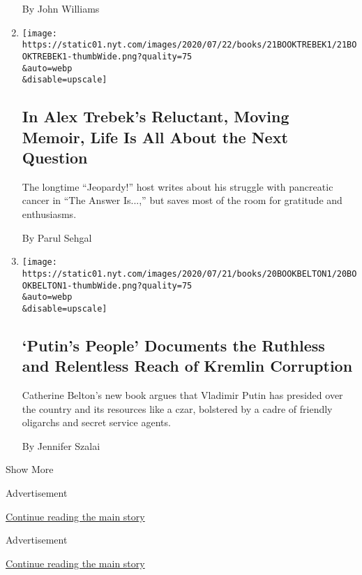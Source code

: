 \begin{enumerate}
  By John Williams
\item
  \href{/2020/07/21/books/review-answer-is-alex-trebek-jeopardy-memoir.html}{}

  \texttt{[image: https://static01.nyt.com/images/2020/07/22/books/21BOOKTREBEK1/21BOOKTREBEK1-thumbWide.png?quality=75\\\&auto=webp\\\&disable=upscale]}

  \hypertarget{in-alex-trebeks-reluctant-moving-memoir-life-is-all-about-the-next-question}{%
  \subsection{In Alex Trebek's Reluctant, Moving Memoir, Life Is All
  About the Next
  Question}\label{in-alex-trebeks-reluctant-moving-memoir-life-is-all-about-the-next-question}}

  The longtime ``Jeopardy!'' host writes about his struggle with
  pancreatic cancer in ``The Answer Is...,'' but saves most of the room
  for gratitude and enthusiasms.

  By Parul Sehgal
\item
  \href{/2020/07/16/books/review-putins-people-kgb-catherine-belton.html}{}

  \texttt{[image: https://static01.nyt.com/images/2020/07/21/books/20BOOKBELTON1/20BOOKBELTON1-thumbWide.png?quality=75\\\&auto=webp\\\&disable=upscale]}

  \hypertarget{putins-people-documents-the-ruthless-and-relentless-reach-of-kremlin-corruption}{%
  \subsection{`Putin's People' Documents the Ruthless and Relentless
  Reach of Kremlin
  Corruption}\label{putins-people-documents-the-ruthless-and-relentless-reach-of-kremlin-corruption}}

  Catherine Belton's new book argues that Vladimir Putin has presided
  over the country and its resources like a czar, bolstered by a cadre
  of friendly oligarchs and secret service agents.

  By Jennifer Szalai
\end{enumerate}

Show More

Advertisement

\protect\hyperlink{after-mid1}{Continue reading the main story}

Advertisement

\protect\hyperlink{after-mktg}{Continue reading the main story}

